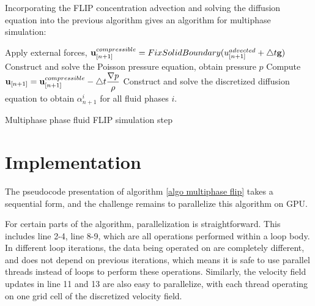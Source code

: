 Incorporating the FLIP concentration advection and solving the diffusion equation into the previous algorithm gives an algorithm for multiphase simulation:

\begin{algorithm}[H]
    \label{algo multiphase flip}

    \SetAlgoLined
    Apply external forces, $\textbf{u}_{[n+1]}^{compressible} =  FixSolidBoundary(u_{[n+1]}^{advected} + \triangle t \textbf{g})$\;
    Construct and solve the Poisson pressure equation, obtain pressure $p$\;
    Compute $\textbf{u}_{[n+1]} = \textbf{u}_{[n+1]}^{compressible} - \triangle t \dfrac{\nabla p}{\rho}$\;
    Construct and solve the discretized diffusion equation to obtain $\alpha^i_{n+1}$ for all fluid phases $i$.

    \caption{Multiphase phase fluid FLIP simulation step}
\end{algorithm}



\section{Implementation}

The pseudocode presentation of algorithm \ref{algo multiphase flip} takes a sequential form, and the challenge remains to parallelize this algorithm on GPU. 

For certain parts of the algorithm, parallelization is straightforward. This includes line 2-4, line 8-9, which are all operations performed within a loop body. In different loop iterations, the data being operated on are completely different, and does not depend on previous iterations, which means it is safe to use parallel threads instead of loops to perform these operations. Similarly, the velocity field updates in line 11 and 13 are also easy to parallelize, with each thread operating on one grid cell of the discretized velocity field. 

